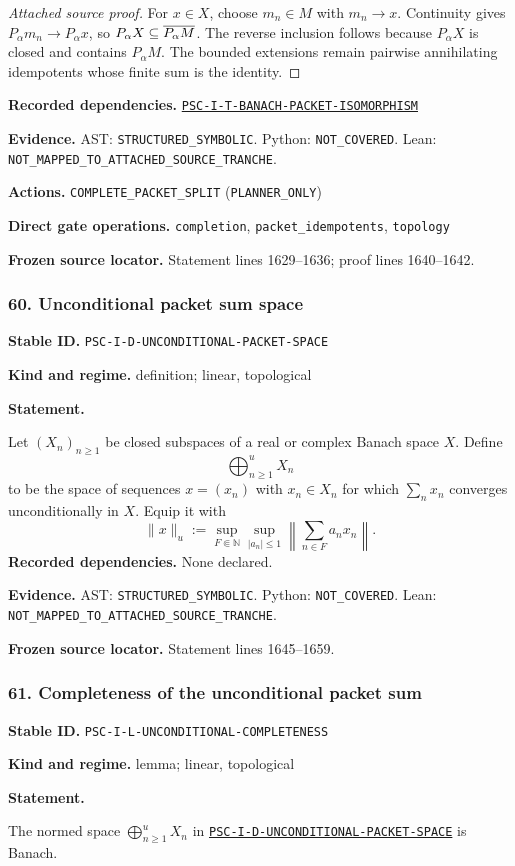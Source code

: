 \documentclass[a4paper,11pt]{article}
\newcommand{\field}[2]{\noindent\textbf{#1.} #2\par}
\begin{document}
\begin{proof}[Attached source proof]
For $x\in X$, choose $m_n\in M$ with $m_n\to x$.  Continuity gives $P_\alpha m_n\to P_\alpha x$, so $P_\alpha X\subseteq\overline{P_\alpha M}$.  The reverse inclusion follows because $P_\alpha X$ is closed and contains $P_\alpha M$.  The bounded extensions remain pairwise annihilating idempotents whose finite sum is the identity.
\end{proof}
\field{Recorded dependencies}{\hyperref[rec:PSC-I-T-BANACH-PACKET-ISOMORPHISM]{\nolinkurl{PSC-I-T-BANACH-PACKET-ISOMORPHISM}}}
\field{Evidence}{AST: \nolinkurl{STRUCTURED_SYMBOLIC}. Python: \nolinkurl{NOT_COVERED}. Lean: \nolinkurl{NOT_MAPPED_TO_ATTACHED_SOURCE_TRANCHE}.}
\field{Actions}{\nolinkurl{COMPLETE_PACKET_SPLIT} (\nolinkurl{PLANNER_ONLY})}
\field{Direct gate operations}{\nolinkurl{completion}, \nolinkurl{packet_idempotents}, \nolinkurl{topology}}
\field{Frozen source locator}{Statement lines 1629--1636; proof lines 1640--1642.}
\subsubsection*{60. Unconditional packet sum space}
\label{rec:PSC-I-D-UNCONDITIONAL-PACKET-SPACE}
\field{Stable ID}{\nolinkurl{PSC-I-D-UNCONDITIONAL-PACKET-SPACE}}
\field{Kind and regime}{definition; linear, topological}
\textbf{Statement.}\par
Let $(X_n)_{n\geq1}$ be closed subspaces of a real or complex Banach space $X$.  Define
\[
\bigoplus_{n\geq1}^{u}X_n
\]
to be the space of sequences $x=(x_n)$ with $x_n\in X_n$ for which $\sum_nx_n$ converges unconditionally in $X$.  Equip it with
\[
\|x\|_u
:=
\sup_{F\Subset\mathbb N}
\sup_{|a_n|\leq1}
\left\|\sum_{n\in F}a_nx_n\right\|.
\]
\field{Recorded dependencies}{None declared.}
\field{Evidence}{AST: \nolinkurl{STRUCTURED_SYMBOLIC}. Python: \nolinkurl{NOT_COVERED}. Lean: \nolinkurl{NOT_MAPPED_TO_ATTACHED_SOURCE_TRANCHE}.}
\field{Frozen source locator}{Statement lines 1645--1659.}
\subsubsection*{61. Completeness of the unconditional packet sum}
\label{rec:PSC-I-L-UNCONDITIONAL-COMPLETENESS}
\field{Stable ID}{\nolinkurl{PSC-I-L-UNCONDITIONAL-COMPLETENESS}}
\field{Kind and regime}{lemma; linear, topological}
\textbf{Statement.}\par
The normed space $\bigoplus_{n\geq1}^{u}X_n$ in \hyperref[rec:PSC-I-D-UNCONDITIONAL-PACKET-SPACE]{\nolinkurl{PSC-I-D-UNCONDITIONAL-PACKET-SPACE}} is Banach.
\end{document}
